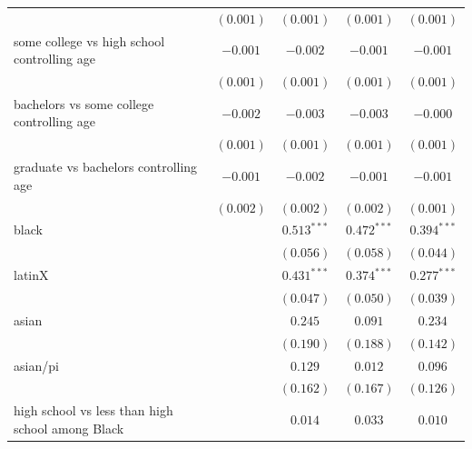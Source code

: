 \documentclass[
  12pt,
  letterpaper,
]{article}
\begin{document}
\begin{table}
\begin{center}
\begin{tabular}{l c c c c}
                                                     & $(0.001)$      & $(0.001)$      & $(0.001)$      & $(0.001)$      \\
some college vs high school controlling age          & $-0.001$       & $-0.002$       & $-0.001$       & $-0.001$       \\
                                                     & $(0.001)$      & $(0.001)$      & $(0.001)$      & $(0.001)$      \\
bachelors vs some college controlling age            & $-0.002$       & $-0.003$       & $-0.003$       & $-0.000$       \\
                                                     & $(0.001)$      & $(0.001)$      & $(0.001)$      & $(0.001)$      \\
graduate vs bachelors controlling age                & $-0.001$       & $-0.002$       & $-0.001$       & $-0.001$       \\
                                                     & $(0.002)$      & $(0.002)$      & $(0.002)$      & $(0.001)$      \\
black                                                &                & $0.513^{***}$  & $0.472^{***}$  & $0.394^{***}$  \\
                                                     &                & $(0.056)$      & $(0.058)$      & $(0.044)$      \\
latinX                                               &                & $0.431^{***}$  & $0.374^{***}$  & $0.277^{***}$  \\
                                                     &                & $(0.047)$      & $(0.050)$      & $(0.039)$      \\
asian                                                &                & $0.245$        & $0.091$        & $0.234$        \\
                                                     &                & $(0.190)$      & $(0.188)$      & $(0.142)$      \\
asian/pi                                             &                & $0.129$        & $0.012$        & $0.096$        \\
                                                     &                & $(0.162)$      & $(0.167)$      & $(0.126)$      \\
high school vs less than high school among Black     &                & $0.014$        & $0.033$        & $0.010$        \\

\end{tabular}
\end{center}
\end{table}
\end{document}
